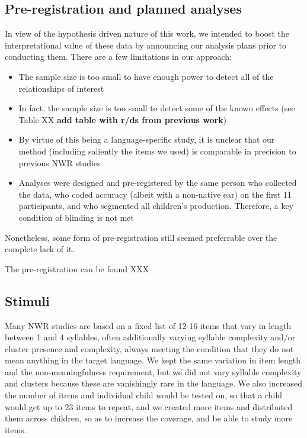 \documentclass[english,,man,floatsintext]{apa6}
\providecommand{\tightlist}{%
  \setlength{\itemsep}{0pt}\setlength{\parskip}{0pt}}
\begin{document}
\hypertarget{pre-registration-and-planned-analyses}{%
\subsection{Pre-registration and planned analyses}\label{pre-registration-and-planned-analyses}}

In view of the hypothesis driven nature of this work, we intended to boost the interpretational value of these data by announcing our analysis plans prior to conducting them. There are a few limitations in our approach:

\begin{itemize}
\tightlist
\item
  The sample size is too small to have enough power to detect all of the relationships of interest
\item
  In fact, the sample size is too small to detect some of the known effects (see Table XX \textbf{add table with r/ds from previous work})
\item
  By virtue of this being a language-specific study, it is unclear that our method (including saliently the items we used) is comparable in precision to previous NWR studies
\item
  Analyses were designed and pre-registered by the same person who collected the data, who coded accuracy (albeit with a non-native ear) on the first 11 participants, and who segmented all children's production. Therefore, a key condition of blinding is not met
\end{itemize}

Nonetheless, some form of pre-registration still seemed preferrable over the complete lack of it.

The pre-registration can be found XXX

\hypertarget{stimuli}{%
\subsection{Stimuli}\label{stimuli}}

Many NWR studies are based on a fixed list of 12-16 items that vary in length between 1 and 4 syllables, often additionally varying syllable complexity and/or cluster presence and complexity, always meeting the condition that they do not mean anything in the target language. We kept the same variation in item length and the non-meaningfulness requirement, but we did not vary syllable complexity and clusters because these are vanishingly rare in the language. We also increased the number of items and individual child would be tested on, so that a child would get up to 23 items to repeat, and we created more items and distributed them across children, so as to increase the coverage, and be able to study more items.
\end{document}
